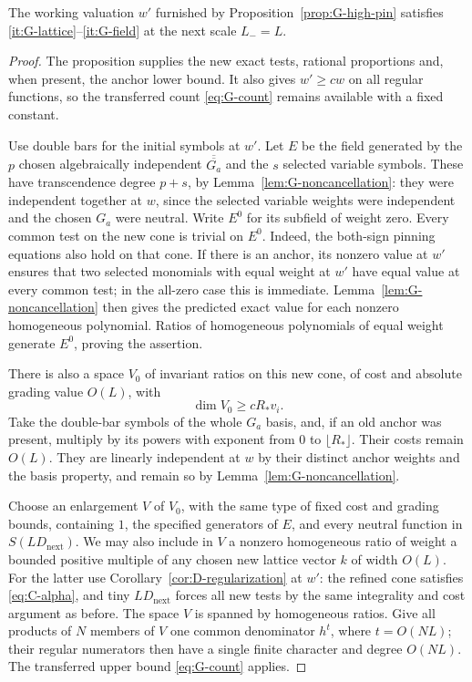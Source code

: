 \begin{lemma}\label{lem:G-pin-consequences}
The working valuation $w'$ furnished by Proposition~\ref{prop:G-high-pin}
satisfies \ref{it:G-lattice}--\ref{it:G-field} at the next scale $L_-=L$.
\end{lemma}
\begin{proof}
The proposition supplies the new exact tests, rational proportions and,
when present, the anchor lower bound.  It also gives $w'\ge c w$ on all
regular functions, so the transferred count \eqref{eq:G-count} remains
available with a fixed constant.

Use double bars for the initial symbols at $w'$.  Let $E$ be the field
generated by the $p$ chosen algebraically independent
$\overline{\overline{G_a}}$ and the $s$ selected variable symbols.
These have transcendence degree $p+s$, by
Lemma~\ref{lem:G-noncancellation}: they were independent together at $w$,
since the selected variable weights were independent and the chosen
$G_a$ were neutral.  Write $E^0$ for its subfield of weight zero.
Every common test on the new cone is trivial on $E^0$.  Indeed, the
both-sign pinning equations also hold on that cone.  If there is an
anchor, its nonzero value at $w'$ ensures that two selected monomials
with equal weight at $w'$ have equal value at every common test; in the
all-zero case this is immediate.  Lemma~\ref{lem:G-noncancellation} then
gives the predicted exact value for each nonzero homogeneous polynomial.
Ratios of homogeneous polynomials of equal weight generate $E^0$,
proving the assertion.

There is also a space $V_0$ of invariant ratios on this new cone, of
cost and absolute grading value $O(L)$, with
\begin{equation}\label{eq:G-large-space}
                       \dim V_0\ge cR_*v_i.
\end{equation}
Take the double-bar symbols of the whole $G_a$ basis, and, if an old
anchor was present, multiply by its powers with exponent from $0$ to
$\lfloor R_*\rfloor$.  Their costs remain $O(L)$.  They are linearly
independent at $w$ by their distinct anchor weights and the basis
property, and remain so by Lemma~\ref{lem:G-noncancellation}.

Choose an enlargement $V$ of $V_0$, with the same type of fixed cost and
grading bounds, containing $1$, the specified generators of $E$, and every
neutral function in $S(LD_{\mathrm{next}})$.  We may also include in $V$ a
nonzero homogeneous ratio of weight a bounded positive multiple of any
chosen new lattice vector $k$ of width $O(L)$.  For the latter use
Corollary~\ref{cor:D-regularization} at $w'$: the refined cone satisfies
\eqref{eq:C-alpha}, and tiny $LD_{\mathrm{next}}$ forces all new tests
by the same integrality and cost argument as before.  The space $V$
is spanned by homogeneous ratios.  Give all products of $N$ members of
$V$ one common denominator $h^t$, where $t=O(NL)$; their regular
numerators then have a single finite character and degree $O(NL)$.
The transferred upper bound \eqref{eq:G-count} applies.


\end{proof}
